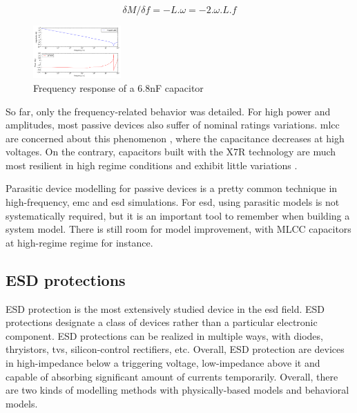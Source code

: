 \begin{equation}
\delta M/ \delta f =  -L.\omega = -2.\omega .L.f
\label{eq:inductor-impedance}
\end{equation}

\begin{figure}[!h]
  \centering
  \includegraphics[width=0.3\textwidth]{src/2/figures/capa_hf_response.png}
  \caption{Frequency response of a 6.8nF capacitor}
  \label{fig:frequency-response-capa}
\end{figure}


So far, only the frequency-related behavior was detailed.
For high power and amplitudes, most passive devices also suffer of nominal ratings variations.
\gls{mlcc} are concerned about this phenomenon \cite{capa-esd-cz}, where the capacitance decreases at high voltages.
On the contrary, capacitors built with the X7R technology are much most resilient in high regime conditions and exhibit little variations \cite{fabien-capas}.

Parasitic device modelling for passive devices is a pretty common technique in high-frequency, \gls{emc} and \gls{esd} simulations.
For \gls{esd}, using parasitic models is not systematically required, but it is an important tool to remember when building a system model.
There is still room for model improvement, with MLCC capacitors at high-regime regime for instance.

\subsection{ESD protections}
\label{esd-protection-modelling}

%
ESD protection is the most extensively studied device in the \gls{esd} field.
ESD protections designate a class of devices rather than a particular electronic component.
ESD protections can be realized in multiple ways, with diodes, thryistors, \gls{tvs}, silicon-control rectifiers, etc.
Overall, ESD protection are devices in high-impedance below a triggering voltage, low-impedance above it and capable of absorbing significant amount of currents temporarily.
Overall, there are two kinds of modelling methods with physically-based models and behavioral models.

